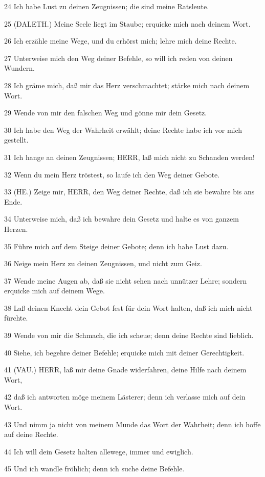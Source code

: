 \par 24 Ich habe Lust zu deinen Zeugnissen; die sind meine Ratsleute.
\par 25 (DALETH.) Meine Seele liegt im Staube; erquicke mich nach deinem Wort.
\par 26 Ich erzähle meine Wege, und du erhörst mich; lehre mich deine Rechte.
\par 27 Unterweise mich den Weg deiner Befehle, so will ich reden von deinen Wundern.
\par 28 Ich gräme mich, daß mir das Herz verschmachtet; stärke mich nach deinem Wort.
\par 29 Wende von mir den falschen Weg und gönne mir dein Gesetz.
\par 30 Ich habe den Weg der Wahrheit erwählt; deine Rechte habe ich vor mich gestellt.
\par 31 Ich hange an deinen Zeugnissen; HERR, laß mich nicht zu Schanden werden!
\par 32 Wenn du mein Herz tröstest, so laufe ich den Weg deiner Gebote.
\par 33 (HE.) Zeige mir, HERR, den Weg deiner Rechte, daß ich sie bewahre bis ans Ende.
\par 34 Unterweise mich, daß ich bewahre dein Gesetz und halte es von ganzem Herzen.
\par 35 Führe mich auf dem Steige deiner Gebote; denn ich habe Lust dazu.
\par 36 Neige mein Herz zu deinen Zeugnissen, und nicht zum Geiz.
\par 37 Wende meine Augen ab, daß sie nicht sehen nach unnützer Lehre; sondern erquicke mich auf deinem Wege.
\par 38 Laß deinen Knecht dein Gebot fest für dein Wort halten, daß ich mich nicht fürchte.
\par 39 Wende von mir die Schmach, die ich scheue; denn deine Rechte sind lieblich.
\par 40 Siehe, ich begehre deiner Befehle; erquicke mich mit deiner Gerechtigkeit.
\par 41 (VAU.) HERR, laß mir deine Gnade widerfahren, deine Hilfe nach deinem Wort,
\par 42 daß ich antworten möge meinem Lästerer; denn ich verlasse mich auf dein Wort.
\par 43 Und nimm ja nicht von meinem Munde das Wort der Wahrheit; denn ich hoffe auf deine Rechte.
\par 44 Ich will dein Gesetz halten allewege, immer und ewiglich.
\par 45 Und ich wandle fröhlich; denn ich suche deine Befehle.
